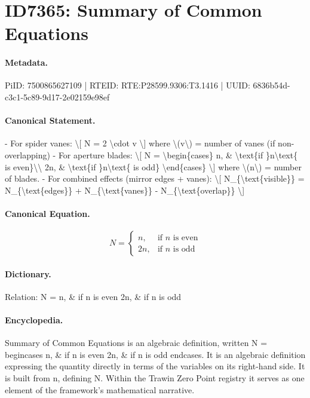 \section*{ID7365: Summary of Common Equations}
\paragraph{Metadata.}
PiID: 7500865627109 | RTEID: RTE:P28599.9306:T3.1416 | UUID: 6836b54d-c3c1-5c89-9d17-2e02159e98ef

\paragraph{Canonical Statement.}
- For spider vanes: \textbackslash{}[ N = 2 \textbackslash{}cdot v \textbackslash{}] where \textbackslash{}(v\textbackslash{}) = number of vanes (if non-overlapping) - For aperture blades: \textbackslash{}[ N = \textbackslash{}begin\{cases\} n, \& \textbackslash{}text\{if \}n\textbackslash{}text\{ is even\}\textbackslash{}\textbackslash{} 2n, \& \textbackslash{}text\{if \}n\textbackslash{}text\{ is odd\} \textbackslash{}end\{cases\} \textbackslash{}] where \textbackslash{}(n\textbackslash{}) = number of blades. - For combined effects (mirror edges + vanes): \textbackslash{}[ N\_\{\textbackslash{}text\{visible\}\} = N\_\{\textbackslash{}text\{edges\}\} + N\_\{\textbackslash{}text\{vanes\}\} - N\_\{\textbackslash{}text\{overlap\}\} \textbackslash{}]

\paragraph{Canonical Equation.}
\[
N = \begin{cases} n, & \text{if }n\text{ is even}\\ 2n, & \text{if }n\text{ is odd} \end{cases}
\]

\paragraph{Dictionary.}
Relation: N = n, \& if n is even 2n, \& if n is odd

\paragraph{Encyclopedia.}
Summary of Common Equations is an algebraic definition, written N = begincases n, \& if n is even 2n, \& if n is odd endcases. It is an algebraic definition expressing the quantity directly in terms of the variables on its right-hand side. It is built from n, defining N. Within the Trawin Zero Point registry it serves as one element of the framework's mathematical narrative.
